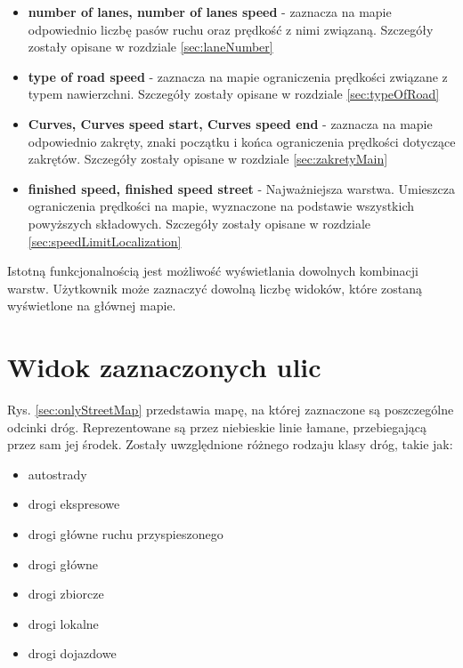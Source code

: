 \begin{itemize}
\item \textbf{number of lanes, number of lanes speed} - zaznacza na mapie odpowiednio liczbę pasów ruchu oraz prędkość z nimi związaną. Szczegóły zostały opisane w rozdziale \ref{sec:laneNumber}
\item \textbf{type of road speed} - zaznacza na mapie ograniczenia prędkości związane z typem nawierzchni. Szczegóły zostały opisane w rozdziale \ref{sec:typeOfRoad}
\item \textbf{Curves, Curves speed start, Curves speed end} - zaznacza na mapie odpowiednio zakręty, znaki początku i końca ograniczenia prędkości dotyczące zakrętów. Szczegóły zostały opisane w rozdziale \ref{sec:zakretyMain}
\item \textbf{finished speed, finished speed street} - Najważniejsza warstwa. Umieszcza ograniczenia prędkości na mapie, wyznaczone na podstawie wszystkich powyższych składowych. Szczegóły zostały opisane w rozdziale \ref{sec:speedLimitLocalization}
\end{itemize}

Istotną funkcjonalnością jest możliwość wyświetlania dowolnych kombinacji warstw. Użytkownik może zaznaczyć dowolną liczbę widoków, które zostaną wyświetlone na głównej mapie.

\newpage
\section{Widok zaznaczonych ulic}
\label{sec:onlyStreet}

Rys. \ref{sec:onlyStreetMap} przedstawia mapę, na której zaznaczone są poszczególne odcinki dróg. Reprezentowane są przez niebieskie linie łamane, przebiegającą przez sam jej środek. Zostały uwzględnione różnego rodzaju klasy dróg, takie jak: 
\begin{itemize}
\item autostrady
\item drogi ekspresowe
\item drogi główne ruchu przyspieszonego
\item drogi główne
\item drogi zbiorcze
\item drogi lokalne
\item drogi dojazdowe
\end{itemize}

